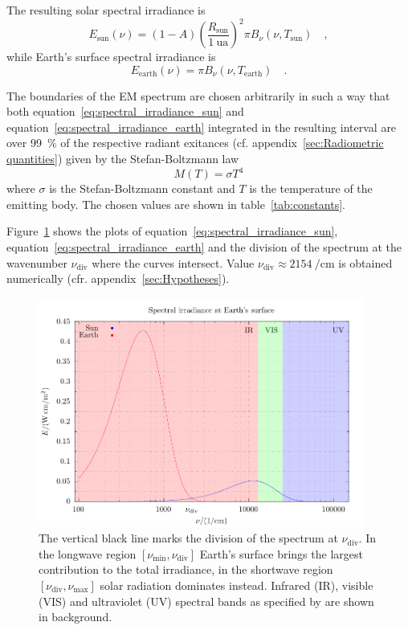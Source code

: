 \documentclass[a4paper,10pt,twocolumn,\classoptions]{article}
\begin{document}
The resulting solar spectral irradiance is
\begin{equation}
  \label{eq:spectral_irradiance_sun}
  E_\text{sun}(\nu) = (1 - A) \left( \frac{R_\text{sun}}{\qty{1}{\astronomicalunit}} \right)^2 \pi B_\nu(\nu, T_\text{sun})
  \quad ,
\end{equation}
while Earth's surface spectral irradiance is
\begin{equation}
  \label{eq:spectral_irradiance_earth}
  E_\text{earth}(\nu) = \pi B_\nu(\nu, T_\text{earth})
  \quad .
\end{equation}

The boundaries of the EM spectrum are chosen arbitrarily in such a way that both equation~\eqref{eq:spectral_irradiance_sun} and equation~\eqref{eq:spectral_irradiance_earth} integrated in the resulting interval are over \qty{99}{\percent} of the respective radiant exitances (cf. appendix~\ref{sec:Radiometric quantities}) given by the Stefan-Boltzmann law
\begin{equation}
  \label{eq:stefan-boltzmann_law}
  M(T) = \sigma T^4
\end{equation}
where $\sigma$ is the Stefan-Boltzmann constant and $T$ is the temperature of the emitting body. The chosen values are shown in table~\ref{tab:constants}.

Figure~\ref{fig:spectral_irradiance} shows the plots of equation~\eqref{eq:spectral_irradiance_sun}, equation~\eqref{eq:spectral_irradiance_earth} and the division of the spectrum at the wavenumber $\nu_\text{div}$ where the curves intersect. Value $\nu_\text{div} \approx \qty{2154}{\per\centi\metre}$ is obtained numerically (cfr. appendix~\ref{sec:Hypotheses}).
\begin{figure}[h]
  \centering
  \includegraphics*[keepaspectratio=true,width=0.95\textwidth]{spectral_irradiance_bands}
  \caption{The vertical black line marks the division of the spectrum at $\nu_\text{div}$. In the longwave region $[\nu_\text{min}, \nu_\text{div}]$ Earth's surface brings the largest contribution to the total irradiance, in the shortwave region $[\nu_\text{div}, \nu_\text{max}]$ solar radiation dominates instead. Infrared (IR), visible (VIS) and ultraviolet (UV) spectral bands as specified by \cite{CIE} are shown in background.}
  \label{fig:spectral_irradiance}
\end{figure}
\end{document}
